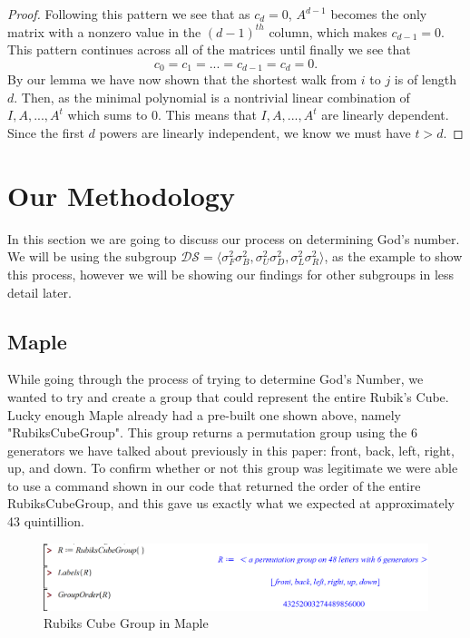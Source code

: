 \documentclass{article}
\begin{document}
\begin{proof}
    Following this pattern we see that as $c_d = 0$, $A^{d-1}$ becomes the only matrix with a nonzero value in the $(d-1)^{th}$ column, which makes $c_{d-1} = 0$.\\
    This pattern continues across all of the matrices until finally we see that $$c_0 = c_1 = ... = c_{d-1} = c_d = 0.$$
    By our lemma we have now shown that the shortest walk from $i$ to $j$ is of length $d$. Then, as the minimal polynomial is a nontrivial linear combination of $I, A, ..., A^t$ which sums to $0$. This means that $I,A, ..., A^t$ are linearly dependent. Since the first $d$ powers are linearly independent, we know we must have $t>d$. 
\end{proof}


\section{Our Methodology}
In this section we are going to discuss our process on determining God's number.  We will be using the subgroup $\mathcal{DS} = \langle\sigma_F^2\sigma_B^2,\sigma_U^2\sigma_D^2,\sigma_L^2\sigma_R^2\rangle$, as the example to show this process, however we will be showing our findings for other subgroups in less detail later.

\subsection{Maple}
While going through the process of trying to determine God’s Number, we wanted to try and create a group that could represent the entire Rubik’s Cube.  Lucky enough Maple already had a pre-built one shown above, namely "RubiksCubeGroup".  This group returns a permutation group using the 6 generators we have talked about previously in this paper: front, back, left, right, up, and down.  To confirm whether or not this group was legitimate we were able to use a command shown in our code that returned the order of the entire RubiksCubeGroup, and this gave us exactly what we expected at approximately 43 quintillion.

\begin{figure}[ht]
    \centering
        \includegraphics[scale=0.6]{images/MapleRC.png}
        \caption{Rubiks Cube Group in Maple}
\end{figure}
\end{document}
